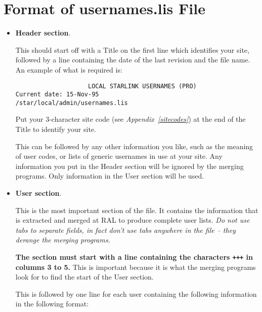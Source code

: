 \documentclass[twoside,11pt]{article}
\begin{document}
\newpage

\section{\label{usernamesfile}Format of usernames.lis File}

\begin{itemize}

\item {\bf Header section}.

This should start off with a Title on the first line which identifies your site,
followed by a line containing the date of the last revision and the file name.
An example of what is required is:

\begin{verbatim}
                    LOCAL STARLINK USERNAMES (PRO)
Current date: 15-Nov-95                    /star/local/admin/usernames.lis
\end{verbatim}
Put your 3-character site code (see {\em Appendix~\ref{sitecodes}}) at the end
of the Title to identify your site.

This can be followed by any other information you like, such as the meaning
of user codes, or lists of generic usernames in use at your site.
Any information you put in the Header section will be ignored by the merging
programs.
Only information in the User section will be used.

\item {\bf User section}.

This is the most important section of the file.
It contains the information that is extracted and merged at RAL to produce
complete user lists.
{\em Do not use tabs to separate fields, in fact don't use tabs anywhere in
the file -- they derange the merging programs.}

{\bf The section must start with a line containing the characters
{\tt +++} in columns 3 to 5.}
This is important because it is what the merging programs look for to find
the start of the User section.

This is followed by one line for each user containing the following
information in the following format:


\end{itemize}
\end{document}
